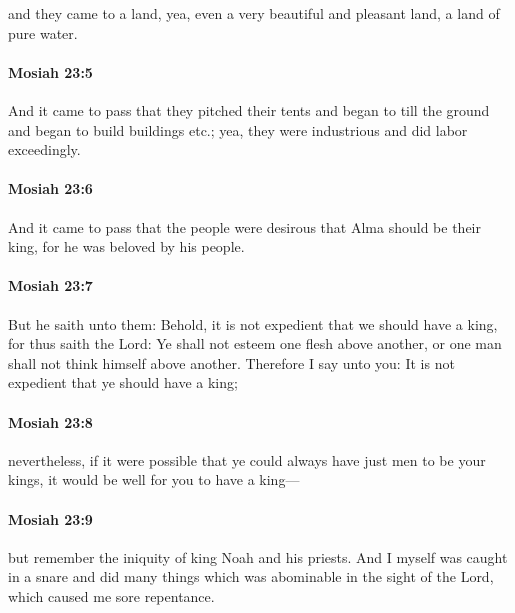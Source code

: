 			and they came to a land,
			yea, even a very beautiful and pleasant land,
			a land of pure water.

		\paragraph{Mosiah 23:5} %
			\label{MOSIAH-23-5}

			And it came to pass that they pitched their tents
			and began to till the ground and began to build buildings etc.;
			yea, they were industrious and did labor exceedingly.

		\paragraph{Mosiah 23:6} %
			\label{MOSIAH-23-6}

			And it came to pass that the people were desirous
			that Alma should be their king,
			for he was beloved by his people.

		\paragraph{Mosiah 23:7} %
			\label{MOSIAH-23-7}

			But he saith unto them:
			Behold, it is not expedient that we should have a king,
			for thus saith the Lord:
			Ye shall not esteem one flesh above another,
			or one man shall not think himself above another.
			Therefore I say unto you:
			It is not expedient that ye should have a king;

		\paragraph{Mosiah 23:8} %
			\label{MOSIAH-23-8}

			nevertheless, if it were possible
			that ye could always have just men to be your kings,
			it would be well for you to have a king---

		\paragraph{Mosiah 23:9} %
			\label{MOSIAH-23-9}

			but remember the iniquity of king Noah and his priests.
			And I myself was caught in a snare
			and did many things which was abominable in the sight of the Lord,
			which caused me sore repentance.

